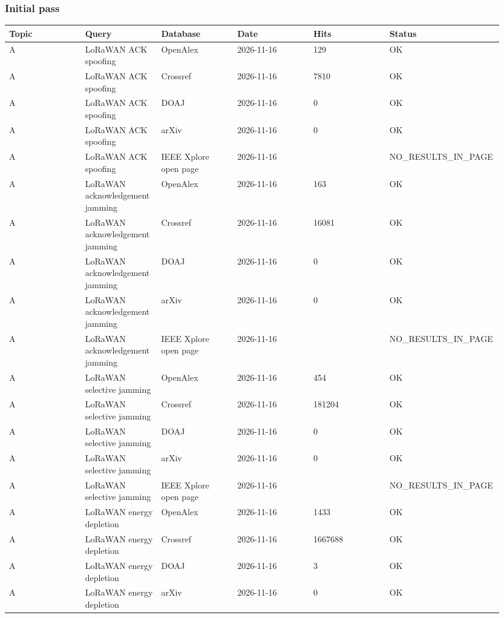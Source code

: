 \subsubsection*{Initial pass}

{\scriptsize\raggedright
\begin{longtable}{p{0.158\linewidth}p{0.158\linewidth}p{0.158\linewidth}p{0.158\linewidth}p{0.158\linewidth}p{0.158\linewidth}}
\toprule
Topic & Query & Database & Date & Hits & Status \\
\midrule
\endhead
A & LoRaWAN ACK spoofing & OpenAlex & 2026-11-16 & 129 & OK \\
A & LoRaWAN ACK spoofing & Crossref & 2026-11-16 & 7810 & OK \\
A & LoRaWAN ACK spoofing & DOAJ & 2026-11-16 & 0 & OK \\
A & LoRaWAN ACK spoofing & arXiv & 2026-11-16 & 0 & OK \\
A & LoRaWAN ACK spoofing & IEEE Xplore open page & 2026-11-16 &  & NO\_RESULTS\_IN\_PAGE \\
A & LoRaWAN acknowledgement jamming & OpenAlex & 2026-11-16 & 163 & OK \\
A & LoRaWAN acknowledgement jamming & Crossref & 2026-11-16 & 16081 & OK \\
A & LoRaWAN acknowledgement jamming & DOAJ & 2026-11-16 & 0 & OK \\
A & LoRaWAN acknowledgement jamming & arXiv & 2026-11-16 & 0 & OK \\
A & LoRaWAN acknowledgement jamming & IEEE Xplore open page & 2026-11-16 &  & NO\_RESULTS\_IN\_PAGE \\
A & LoRaWAN selective jamming & OpenAlex & 2026-11-16 & 454 & OK \\
A & LoRaWAN selective jamming & Crossref & 2026-11-16 & 181204 & OK \\
A & LoRaWAN selective jamming & DOAJ & 2026-11-16 & 0 & OK \\
A & LoRaWAN selective jamming & arXiv & 2026-11-16 & 0 & OK \\
A & LoRaWAN selective jamming & IEEE Xplore open page & 2026-11-16 &  & NO\_RESULTS\_IN\_PAGE \\
A & LoRaWAN energy depletion & OpenAlex & 2026-11-16 & 1433 & OK \\
A & LoRaWAN energy depletion & Crossref & 2026-11-16 & 1667688 & OK \\
A & LoRaWAN energy depletion & DOAJ & 2026-11-16 & 3 & OK \\
A & LoRaWAN energy depletion & arXiv & 2026-11-16 & 0 & OK \\

\end{longtable}}
